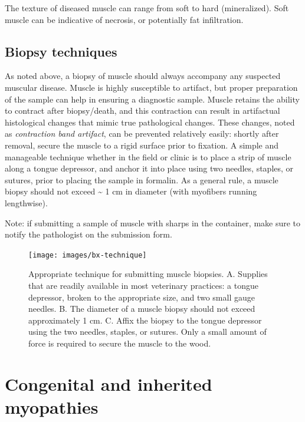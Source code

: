 \documentclass[openany]{book}
\begin{document}
The texture of diseased muscle can range from soft to hard
(mineralized). Soft muscle can be indicative of necrosis, or potentially
fat infiltration.

\section{Biopsy techniques}\label{biopsy-techniques}

As noted above, a biopsy of muscle should always accompany any suspected
muscular disease. Muscle is highly susceptible to artifact, but proper
preparation of the sample can help in ensuring a diagnostic sample.
Muscle retains the ability to contract after biopsy/death, and this
contraction can result in artifactual histological changes that mimic
true pathological changes. These changes, noted as \emph{contraction
band artifact}, can be prevented relatively easily: shortly after
removal, secure the muscle to a rigid surface prior to fixation. A
simple and manageable technique whether in the field or clinic is to
place a strip of muscle along a tongue depressor, and anchor it into
place using two needles, staples, or sutures, prior to placing the
sample in formalin. As a general rule, a muscle biopsy should not exceed
\textasciitilde{} 1 cm in diameter (with myofibers running lengthwise).

Note: if submitting a sample of muscle with sharps in the container,
make sure to notify the pathologist on the submission form.

\begin{figure}

{\centering \texttt{[image: images/bx-technique]} 

}

\caption{Appropriate technique for submitting muscle biopsies. A. Supplies that are readily available in most veterinary practices: a tongue depressor, broken to the appropriate size, and two small gauge needles. B. The diameter of a muscle biopsy should not exceed approximately 1 cm. C. Affix the biopsy to the tongue depressor using the two needles, staples, or sutures. Only a small amount of force is required to secure the muscle to the wood.}\label{fig:bx-technique}
\end{figure}

\chapter{Congenital and inherited
myopathies}\label{congenital-and-inherited-myopathies}
\end{document}

